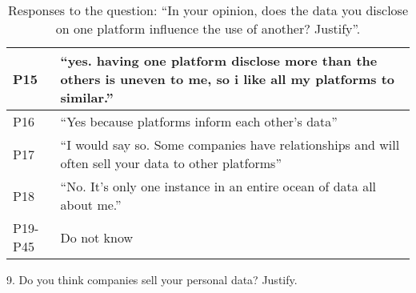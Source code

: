 \begin{table}[H]
\begin{longtable}{p{3cm} p{13cm}}
        \hline
        P15 & ``yes. having one platform disclose more than the others is uneven to me, so i like all my platforms to similar.'' \\
        \hline
        P16 & ``Yes because platforms inform each other's data'' \\
        \hline
        P17 & ``I would say so. Some companies have relationships and will often sell your data to other platforms'' \\
        \hline
        P18 & ``No. It's only one instance in an entire ocean of data all about me.'' \\
        \hline
        P19-P45 & Do not know \\
        \hline
    \end{longtable}
    \vspace{1em}
    \caption*{Responses to the question: ``In your opinion, does the data you disclose on one platform influence the use of another? Justify''.}
    \label{table:survey_s5_q8}
\end{table}

9. Do you think companies sell your personal data? Justify.

